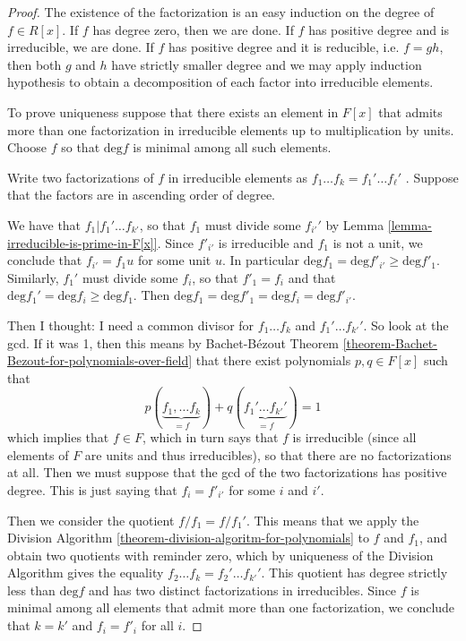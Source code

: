 \begin{proof}
The existence of the factorization is an easy induction on the degree of $f\in
R[x]$. If $f$ has degree zero, then we are done. If $f$ has positive degree and
is irreducible, we are done. If $f$ has positive degree and it is reducible,
i.e. $f=gh$, then both $g$ and $h$ have strictly smaller degree and we may apply
induction hypothesis to obtain a decomposition of each factor into irreducible
elements.

To prove uniqueness suppose that there exists an element in $F[x]$ that admits
more than one factorization in irreducible elements 
up to multiplication by units. Choose $f$ so that
$\text{deg}f$ is minimal among all such elements.

Write two factorizations of $f$ in irreducible elements as 
$f_1\ldots f_k=f_1'\ldots f_\ell'$ . Suppose that the factors are in
ascending order of degree.

We have that $f_1|f_1'\ldots f_{k'}$, so
that $f_1$ must divide some $f_{i'}'$ 
by Lemma \ref{lemma-irreducible-is-prime-in-F[x]}. 
Since $f'_{i'}$ is irreducible and $f_1$ is
not a unit, we conclude that $f_{i'}=f_1 u$ for some unit $u$. In particular
$\text{deg}f_1 =\text{deg}f'_{i'}\geq \text{deg}f'_1$. 
Similarly, $f_1'$ must divide some $f_i$, so that $f'_1=f_i$ and
that $\text{deg}f_1'=\text{deg}f_{i}\geq \text{deg}f_1$. 
Then $\text{deg}f_1=\text{deg}f'_1=\text{deg}f_i=\text{deg}f'_{i'}$. 

Then I thought: I need a common divisor for $f_1\ldots f_k$ and 
$f_1'\ldots f_{k'}'$. So look at the gcd. If it was 1, then this means by
Bachet-Bézout Theorem \ref{theorem-Bachet-Bezout-for-polynomials-over-field}
that there exist polynomials $p,q \in F[x]$ such that
$$
p(\underbrace{f_1,\ldots f_k}_{=f})
+q(\underbrace{f_1'\ldots f_{k'}'}_{=f})=1
$$
which implies that $f \in F$, which in turn
says that $f$ is irreducible (since all elements of $F$ are units and thus
irreducibles), so that there are no factorizations at all.
Then we must suppose that the gcd of the two factorizations has
positive degree. This is just saying that $f_i=f'_{i'}$ for some $i$ and
$i'$.

Then we consider the quotient $f/f_1=f/f_1'$. This means that we apply the
Division Algorithm \ref{theorem-division-algoritm-for-polynomials}
to  $f$ and  $f_1$, and obtain two quotients with reminder
zero, which by uniqueness of the Division Algorithm gives the equality
$f_2\ldots f_k=f_2'\ldots f_{k'}'$.
This quotient has degree strictly less than $\text{deg} f$ and has two distinct
factorizations in irreducibles. Since $f$ is minimal among all
elements that admit more than one factorization, we conclude that $k=k'$ and
$f_i=f'_i$ for all $i$.
\end{proof}

